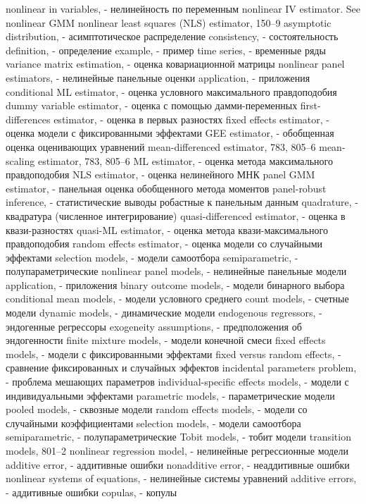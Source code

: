 nonlinear in variables, - нелинейность по переменным
nonlinear IV estimator. See nonlinear GMM nonlinear least squares (NLS) estimator, 150–9
asymptotic distribution, - асимптотическое распределение 
consistency, - состоятельность
definition, - определение
example, - пример
time series, - временные ряды
variance matrix estimation, - оценка ковариационной матрицы
nonlinear panel estimators, - нелинейные панельные оценки
application, - приложения
conditional ML estimator, - оценка условного максимального правдоподобия
dummy variable estimator, - оценка с помощью дамми-переменных 
first-differences estimator, - оценка в первых разностях
fixed effects estimator, - оценка модели с фиксированными эффектами
GEE estimator, - обобщенная оценка оценивающих уравнений
mean-differenced estimator, 783, 805–6 
mean-scaling estimator, 783, 805–6
ML estimator, - оценка метода максимального правдоподобия
NLS estimator, - оценка нелинейного МНК
panel GMM estimator, - панельная оценка обобщенного метода моментов
panel-robust inference, - статистические выводы робастные к панельным данным
quadrature, - квадратура (численное интегрирование)
quasi-differenced estimator, - оценка в квази-разностях
quasi-ML estimator, - оценка метода квази-максимального правдоподобия
random effects estimator, - оценка модели со случайными эффектами
selection models, - модели самоотбора
semiparametric, - полупараметрические
nonlinear panel models, - нелинейные панельные модели
application, - приложения
binary outcome models, - модели бинарного выбора
conditional mean models, - модели условного среднего
count models, - счетные модели
dynamic models, - динамические модели 
endogenous regressors, - эндогенные регрессоры 
exogeneity assumptions, - предположения об эндогенности
finite mixture models, - модели конечной смеси
fixed effects models, - модели с фиксированными эффектами
fixed versus random effects, - сравнение фиксированных и случайных эффектов 
incidental parameters problem, - проблема мешающих параметров
individual-specific effects models, - модели с индивидуальными эффектами 
parametric models, - параметрические модели
pooled models, - сквозные модели
random effects models, - модели со случайными коэффициентами
selection models, - модели самоотбора
semiparametric, - полупараметрические
Tobit models, - тобит модели
transition models, 801–2
nonlinear regression model, - нелинейные регрессионные модели
additive error, - аддитивные ошибки
nonadditive error, - неаддитивные ошибки
nonlinear systems of equations, - нелинейные системы уравнений
additive errors, - аддитивные ошибки
copulas, - копулы
